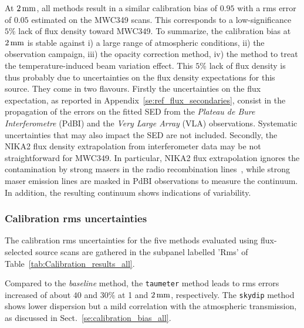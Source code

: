 At $2\,\rm{mm}$, all methods result in a similar calibration bias
of $0.95$ with a rms error of $0.05$ estimated on the MWC349 scans. 
This corresponds to a low-significance $5\%$ lack of flux density
toward MWC349.
To summarize, the calibration bias at $2\, \rm{mm}$ is stable against
i) a large range of atmospheric conditions, ii) the observation campaign, iii) the
opacity correction method, iv) the method to treat the
temperature-induced beam variation effect.
This $5\%$ lack of flux density is thus probably due to
uncertainties on the flux density expectations for this source.
They come in two flavours.
{\lp Firstly the uncertainties on the flux expectation, as reported in
Appendix~\ref{se:ref_flux_secondaries}, consist in the propagation of
the errors on the fitted SED from the \emph{Plateau de Bure Interferometre}
(PdBI) and the \emph{Very Large Array} (VLA) observations. Systematic
uncertainties that may also impact the SED are not included.}  
Secondly, the NIKA2 flux density extrapolation from
interferometer data may be not straightforward for MWC349. {\lp In
particular, NIKA2 flux extrapolation ignores the contamination by
strong masers in the radio recombination lines~\citep{masingRRL},
while strong maser emission lines are masked in PdBI observations to
measure the continuum. In addition, the resulting continuum shows
indications of variability.}


\subsubsection{Calibration rms uncertainties}

The calibration rms uncertainties for the five methods evaluated using
flux-selected source scans are gathered in the subpanel labelled 'Rms'
of Table~\ref{tab:Calibration_results_all}.

Compared to the \emph{baseline} method, the {\tt taumeter} method leads to 
rms errors increased of about $40$ and $30\%$ at 1 and
$2\,\rm{mm}$, respectively. The {\tt skydip} method shows lower
dispersion but a mild correlation with the atmospheric transmission, as
discussed in Sect.~\ref{se:calibration_bias_all}.

